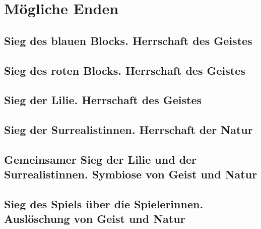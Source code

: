 \section{Mögliche Enden} 
\subsection{Sieg des blauen Blocks. Herrschaft des Geistes} 
\subsection{Sieg des roten Blocks. Herrschaft des Geistes} 
\subsection{Sieg der Lilie. Herrschaft des Geistes} 
\subsection{Sieg der Surrealistinnen. Herrschaft der Natur} 
\subsection{Gemeinsamer Sieg der Lilie und der Surrealistinnen. Symbiose von
Geist und Natur} 
\subsection{Sieg des Spiels über die Spielerinnen. Auslöschung von Geist und
Natur} 
